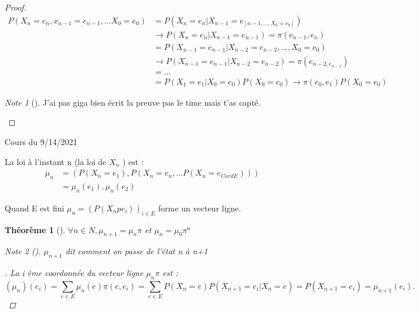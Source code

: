 \documentclass{article}
\theoremstyle{plain}%
\newtheorem{thm}{Théorème}[section]
\theoremstyle{definition}
\theoremstyle{remark}
\newtheorem*{note}{Note}
\begin{document}
	
	\begin{proof}
		\begin{align*}
			P(X_n=e_n, x_{n-1}=e_{n-1}, ... X_0 = e_0)
			&= P(X_n=e_n |X_{n-1} = e_[n-1, ..., X_0=e_0]) \\
			&\rightarrow P(X_n =e_n | X_{n-1} = e_{n-1}) = \pi (e_{n-1}, e_n) \\
			&= P(X_{n-1} = e_{n-1} | X_{n-2} = e_{n-2}, ... ,X_0=e_0)\\
			&\rightarrow P(X_{n-1} = e_{n-1} | X_{n-2} = e_{n-2}) = \pi (e_{n-2, e_{n-1}}) \\
			&= ... \\
			&= P(X_1 = e_1 | X_0=e_0)P(X_0 = e_0) \rightarrow \pi (e_0,e_1) P(X_0=e_0)
		\end{align*}
		\begin{note}[]
			J'ai pas giga bien écrit la preuve pas le time mais t'as capté.
		\end{note}
	\end{proof}	
	
	
Cours du 9/14/2021

La loi à l'instant n (la loi de $ X_n $ ) est : 
\begin{align*}
	\mu _n &= (P(X_n = e_1), P(X _{n} = e _{n} , ... P(X _{n} = e _{Card E}))) \\ 
	&= \mu_n (e_1), \mu_n (e_2)
\end{align*}

Quand E est fini $ \mu _n = (P(X_n p e_i))_{i \in E } $  forme un vecteur ligne.

\begin{thm}[]
	$ \forall n \in  N, \mu _{n+1} = \mu _{n} \pi  $ et $ \mu _{n} = \mu _0 \pi ^n $
	\begin{note}[]
		$ \mu _{n+1}   $ dit comment on passe de l'état n à n+1
	\end{note}

	\begin{proof}[]
		La i ème coordonnée du vecteur ligne $ \mu _{n} \pi  $  est : 
		\[
			(\mu _{n} )(e_i) = \sum_{e \in E}^{} \mu _{n} (e) \pi (e,e_i) = \sum_{e \in E}^{}P(X _{n} = e) P(X _{n+1} = e_i | X _{n} =e) = P(X _{n+1} = e_i	) = \mu  _{n+1} (e_i)
		.\]
	\end{proof}
\end{thm}
\end{document}
